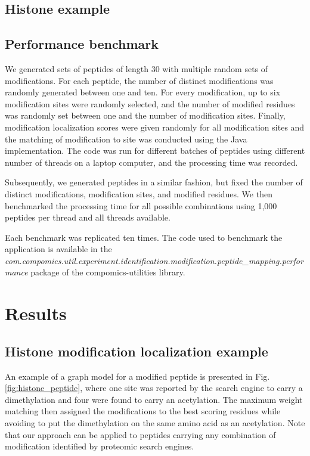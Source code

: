 \documentclass[]{article}
\begin{document}
\subsection{Histone example}


\subsection{Performance benchmark}

We generated sets of peptides of length 30 with multiple random sets of modifications. For each peptide, the number of distinct modifications was randomly generated between one and ten. For every modification, up to six modification sites were randomly selected, and the number of modified residues was randomly set between one and the number of modification sites. Finally, modification localization scores were given randomly for all modification sites and the matching of modification to site was conducted using the Java implementation. The code was run for different batches of peptides using different number of threads on a laptop computer, and the processing time was recorded. 

Subsequently, we generated peptides in a similar fashion, but fixed the number of distinct modifications, modification sites, and modified residues. We then benchmarked the processing time for all possible combinations using 1,000 peptides per thread and all threads available.

Each benchmark was replicated ten times. The code used to benchmark the application is available in the \textit{com.compomics.util.experiment.identification.modification.peptide\_mapping.performance} package of the compomics-utilities library.


\section{Results}

\subsection{Histone modification localization example}


 An example of a graph model for a modified peptide is presented in Fig. \ref{fig:histone_peptide}, where one site was reported by the search engine to carry a dimethylation and four were found to carry an acetylation. The maximum weight matching then assigned the modifications to the best scoring residues while avoiding to put the dimethylation on the same amino acid as an acetylation. Note that our approach can be applied to peptides carrying any combination of modification identified by proteomic search engines.
 
\end{document}
